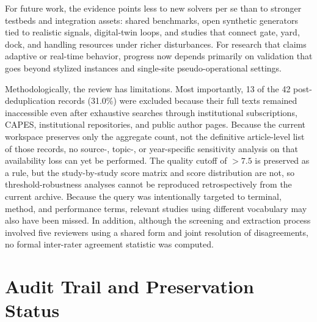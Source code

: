 \documentclass[preprint,12pt,number,longtitle]{elsarticle}
\begin{document}
For future work, the evidence points less to new solvers per se than to stronger testbeds and integration assets: shared benchmarks, open synthetic generators tied to realistic signals, digital-twin loops, and studies that connect gate, yard, dock, and handling resources under richer disturbances. For research that claims adaptive or real-time behavior, progress now depends primarily on validation that goes beyond stylized instances and single-site pseudo-operational settings.

Methodologically, the review has limitations. Most importantly, 13 of the 42 post-deduplication records (31.0\%) were excluded because their full texts remained inaccessible even after exhaustive searches through institutional subscriptions, CAPES, institutional repositories, and public author pages. Because the current workspace preserves only the aggregate count, not the definitive article-level list of those records, no source-, topic-, or year-specific sensitivity analysis on that availability loss can yet be performed. The quality cutoff of $> 7.5$ is preserved as a rule, but the study-by-study score matrix and score distribution are not, so threshold-robustness analyses cannot be reproduced retrospectively from the current archive. Because the query was intentionally targeted to terminal, method, and performance terms, relevant studies using different vocabulary may also have been missed. In addition, although the screening and extraction process involved five reviewers using a shared form and joint resolution of disagreements, no formal inter-rater agreement statistic was computed.

\appendix

\section{Audit Trail and Preservation Status}
\label{app:audit}
\end{document}
